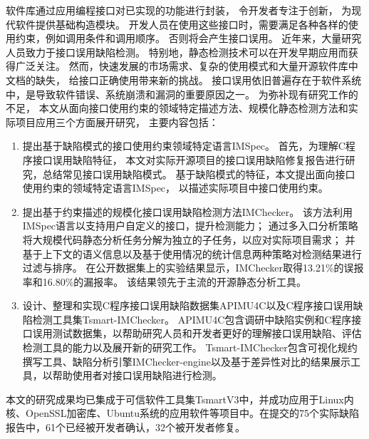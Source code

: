 \begin{cabstract}
  软件库通过应用编程接口对已实现的功能进行封装，
  令开发者专注于创新，
  为现代软件提供基础构造模块。
  开发人员在使用这些接口时，需要满足各种各样的使用约束，例如调用条件和调用顺序。
  否则将会产生接口误用。
  近年来，大量研究人员致力于接口误用缺陷检测。
  特别地，静态检测技术可以在开发早期应用而获得广泛关注。
  然而，快速发展的市场需求、复杂的使用模式和大量开源软件库中文档的缺失，
  给接口正确使用带来新的挑战。
  接口误用依旧普遍存在于软件系统中，是导致软件错误、系统崩溃和漏洞的重要原因之一。
  为弥补现有研究工作的不足，
  本文从面向接口使用约束的领域特定描述方法、规模化静态检测方法和实际项目应用三个方面展开研究，
  主要内容包括：
  \begin{enumerate}
  	\item 提出基于缺陷模式的接口使用约束领域特定语言IMSpec。
  	首先，为理解C程序接口误用缺陷特征，
  	本文对实际开源项目的接口误用缺陷修复报告进行研究，总结常见接口误用缺陷模式。
  	基于缺陷模式的特征，本文提出面向接口使用约束的领域特定语言IMSpec，
  	以描述实际项目中接口使用约束。
  	\item 提出基于约束描述的规模化接口误用缺陷检测方法IMChecker。
  	该方法利用IMSpec语言以支持用户自定义的接口，提升检测能力；
  	通过多入口分析策略将大规模代码静态分析任务分解为独立的子任务，以应对实际项目需求；
  	并基于上下文的语义信息以及基于使用情况的统计信息两种策略对检测结果进行过滤与排序。
  	在公开数据集上的实验结果显示，IMChecker取得13.21\%的误报率和16.80\%的漏报率。
  	该结果领先于主流的开源静态分析工具。
  	\item 设计、整理和实现C程序接口误用缺陷数据集APIMU4C以及C程序接口误用缺陷检测工具集Tsmart-IMChecker。
  	APIMU4C包含调研中缺陷实例和C程序接口误用测试数据集，以帮助研究人员和开发者更好的理解接口误用缺陷、评估检测工具的能力以及展开新的研究工作。
  	Tsmart-IMChecker包含可视化规约撰写工具、缺陷分析引擎IMChecker-engine以及基于差异性对比的结果展示工具，以帮助使用者对接口误用缺陷进行检测。
  \end{enumerate}
  
  本文的研究成果均已集成于可信软件工具集TsmartV3中，并成功应用于Linux内核、OpenSSL加密库、Ubuntu系统的应用软件等项目中。在提交的75个实际缺陷报告中，61个已经被开发者确认，32个被开发者修复。
  
\end{cabstract}


